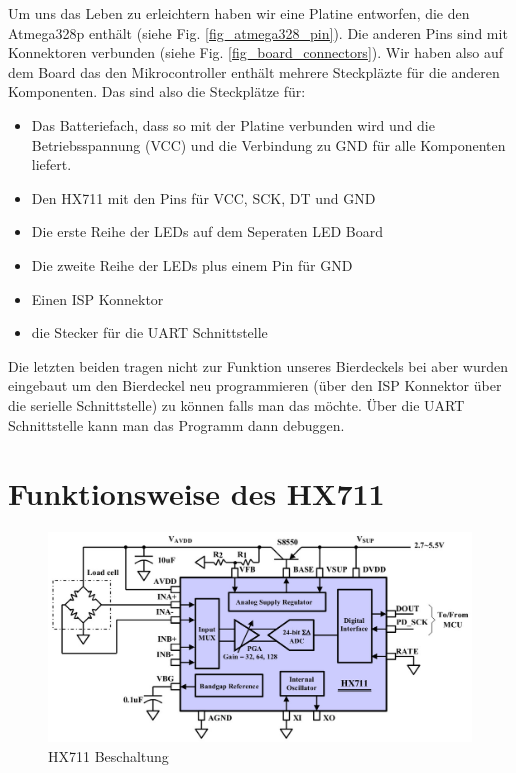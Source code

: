 \documentclass[12pt,journal,compsoc]{IEEEtran}
\begin{document}
Um uns das Leben zu erleichtern haben wir eine Platine entworfen, die den Atmega328p enthält
(siehe Fig. \ref{fig_atmega328_pin}). Die anderen Pins sind mit Konnektoren verbunden (siehe Fig. \ref{fig_board_connectors}).
Wir haben also auf dem Board das den Mikrocontroller enthält mehrere Steckpläzte für die anderen
Komponenten. Das sind also die Steckplätze für:
\begin{itemize}
 \item Das Batteriefach, dass so mit der Platine verbunden wird und die Betriebsspannung (VCC) und die Verbindung zu GND für alle Komponenten liefert.
 \item Den HX711 mit den Pins für VCC, SCK, DT und GND
 \item Die erste Reihe der LEDs auf dem Seperaten LED Board
 \item Die zweite Reihe der LEDs plus einem Pin für GND
 \item Einen ISP Konnektor
 \item die Stecker für die UART Schnittstelle
\end{itemize}

Die letzten beiden tragen nicht zur Funktion unseres Bierdeckels bei aber wurden eingebaut um den
Bierdeckel neu programmieren (über den ISP Konnektor über die serielle Schnittstelle) zu können
falls man das möchte. Über die UART Schnittstelle kann man das Programm dann debuggen.

\section{Funktionsweise des HX711}

\begin{figure}[!t]
\centering
\includegraphics[width=7in]{images/HX711.jpg}%
\caption{HX711 Beschaltung}
\label{fig_HX711}
\end{figure}
\end{document}

